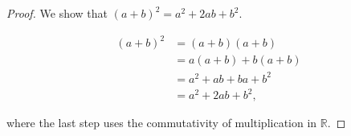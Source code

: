 
\begin{proof}
  We show that $(a + b)^2 = a^2 + 2ab + b^2$.

  \begin{align*}
    (a + b)^2 &= (a + b)(a + b) \\
              &= a(a + b) + b(a + b) \\
              &= a^2 + ab + ba + b^2 \\
              &= a^2 + 2ab + b^2,
  \end{align*}

  where the last step uses the commutativity of multiplication in $\mathbb{R}$.
\end{proof}
